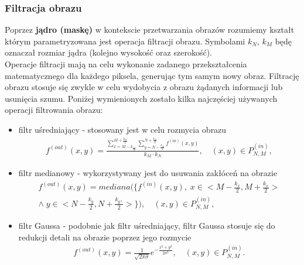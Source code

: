 \subsubsection{Filtracja obrazu}
Poprzez \textbf{jądro (maskę)} w kontekscie przetwarzania obrazów rozumiemy kształt którym parametryzowana jest operacja filtracji obrazu. Symbolami $k_N$, $k_M$ będę oznaczał rozmiar jądra (kolejno wysokość oraz szerokość).\\
Operacje filtracji mają na celu wykonanie zadanego przekształcenia matematycznego dla każdego piksela, generując tym samym nowy obraz. Filtrację obrazu stosuje się zwykle w celu wydobycia z obrazu żądanych informacji lub usunięcia szumu. Poniżej wymienionych zostało kilka najczęściej używanych operacji filtrowania obrazu:
\begin{itemize}
\item filtr uśredniający - stosowany jest w celu rozmycia obrazu
  \begin{gather*}
    f^{(out)}(x, y) = \frac{\sum\limits_{x=M-k_\frac{M}{2}}^{M+\frac{k_M}{2}} \sum\limits_{y=N-\frac{k_N}{2}}^{N+\frac{k_N}{2}} f^{(in)}(x, y)}{k_M \cdot k_N}, \quad (x, y) \in P^{(in)}_{N,M},
  \end{gather*}
\item filtr medianowy - wykorzystywany jest do usuwania zakłóceń na obrazie
  \begin{gather*}
    f^{(out)}(x, y) = mediana(\{f^{(in)}(x, y), \;x \in \big< M-\frac{k_x}{2}, M+\frac{k_x}{2}\big> \\
    \wedge\; y \in \big< N-\frac{k_y}{2}, N+\frac{k_y,}{2}\big>\}), \quad (x, y) \in P^{(in)}_{N,M},
  \end{gather*}
\item filtr Gaussa - podobnie jak filtr uśredniający, filtr Gaussa stosuje się do redukcji detali na obrazie poprzez jego rozmycie
  \begin{gather*}
    f^{(out)}(x, y) = \frac{1}{\sqrt{2 \pi \sigma}} e^{-\frac{x^2+y^2}{2 \sigma^2}}, \quad (x, y) \in P^{(in)}_{N,M}.
  \end{gather*}
\end{itemize}

